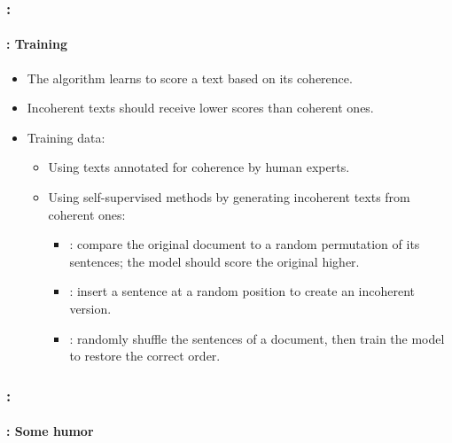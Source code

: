 \documentclass[xcolor=table]{beamer}
\begin{document}
\begin{frame}
	\frametitle{\insertshortsubtitle: \insertsection}
	\framesubtitle{\insertsubsection: Training}
	
	\begin{itemize}
		\item The algorithm learns to score a text based on its coherence.
		\item Incoherent texts should receive lower scores than coherent ones.
		\item Training data:
		\begin{itemize}
			\item Using texts annotated for coherence by human experts.
			\item Using self-supervised methods by generating incoherent texts from coherent ones:
			\begin{itemize}
				\item {}: compare the original document to a random permutation of its sentences; the model should score the original higher.
				\item {}: insert a sentence at a random position to create an incoherent version.
				\item {}: randomly shuffle the sentences of a document, then train the model to restore the correct order.
			\end{itemize}
		\end{itemize}
	\end{itemize}
	
	
\end{frame}

\begin{frame}
	\frametitle{\insertshortsubtitle: \insertsection}
	\framesubtitle{\insertsubsection: Some humor}
	
	\begin{center}
	\end{center}
	
\end{frame}


\end{document}
